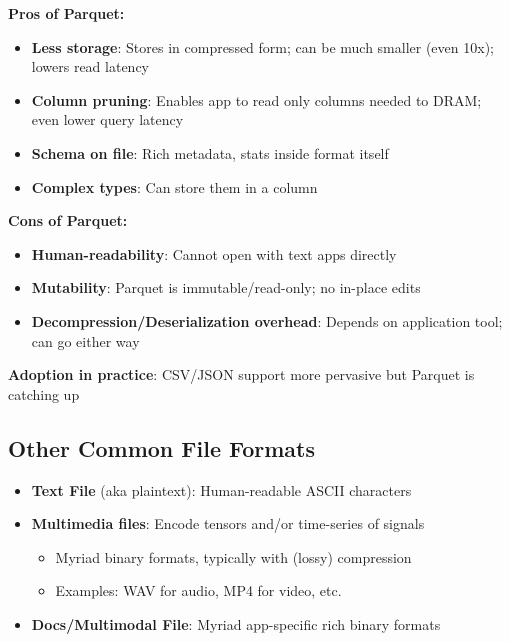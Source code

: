 \documentclass[12pt]{article}
\begin{document}
\begin{tcolorbox}[colback=green!5!white,colframe=green!75!black,title={Parquet vs. Text-Based Files Tradeoffs}]
\textbf{Pros of Parquet:}
\begin{itemize}
    \item \textbf{Less storage}: Stores in compressed form; can be much smaller (even 10x); lowers read latency
    \item \textbf{Column pruning}: Enables app to read only columns needed to DRAM; even lower query latency
    \item \textbf{Schema on file}: Rich metadata, stats inside format itself
    \item \textbf{Complex types}: Can store them in a column
\end{itemize}

\textbf{Cons of Parquet:}
\begin{itemize}
    \item \textbf{Human-readability}: Cannot open with text apps directly
    \item \textbf{Mutability}: Parquet is immutable/read-only; no in-place edits
    \item \textbf{Decompression/Deserialization overhead}: Depends on application tool; can go either way
\end{itemize}

\textbf{Adoption in practice}: CSV/JSON support more pervasive but Parquet is catching up
\end{tcolorbox}

\subsection{Other Common File Formats}

\begin{itemize}
    \item \textbf{Text File} (aka plaintext): Human-readable ASCII characters
    \item \textbf{Multimedia files}: Encode tensors and/or time-series of signals
    \begin{itemize}
        \item Myriad binary formats, typically with (lossy) compression
        \item Examples: WAV for audio, MP4 for video, etc.
    \end{itemize}
    \item \textbf{Docs/Multimodal File}: Myriad app-specific rich binary formats
\end{itemize}
\end{document}
